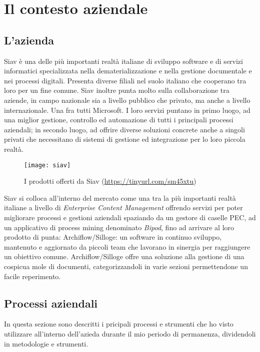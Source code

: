 
\chapter{Il contesto aziendale}

\section{L'azienda}
Siav è una delle più importanti realtà italiane di sviluppo software e di servizi informatici
specializzata nella dematerializzazione e nella gestione documentale e nei processi
digitali. Presenta diverse filiali nel suolo italiano che cooperano tra loro per un fine comune. Siav inoltre punta molto sulla collaborazione tra aziende, in campo nazionale sia a livello pubblico che privato, ma anche a livello internazionale. Una fra tutti Microsoft.
I loro servizi puntano in primo luogo, ad una miglior gestione, controllo ed automazione di tutti i principali processi aziendali; in secondo luogo, ad offrire diverse soluzioni concrete anche a singoli privati che necessitano di sistemi di gestione ed integrazione per lo loro piccola realtà.
\begin{figure}[!h] 
	\centering 
	\texttt{[image: siav]} 
	\caption{I prodotti offerti da Siav (\url{https://tinyurl.com/sm45xtu})}
\end{figure}
Siav si colloca all'interno del mercato come una tra la più importanti realtà italiane a livello di \textit{Enterprise Content Management} offrendo servizi per poter migliorare processi e gestioni aziendali spaziando da un gestore di caselle PEC, ad un applicativo di process mining denominato \textit{Bipod}, fino ad arrivare al loro prodotto di punta: Archiflow/Silloge: un software in continuo sviluppo, mantenuto e aggiornato da piccoli team che lavorano in sinergia per raggiungere un obiettivo comune. Archiflow/Silloge offre una soluzione alla gestione di una cospicua mole di documenti, categorizzandoli in varie sezioni permettendone un facile reperimento.
\section {Processi aziendali}
In questa sezione sono descritti i pricipali processi e strumenti che ho visto utilizzare all'interno dell'azieda durante il mio periodo di permanenza, dividendoli in metodologie e strumenti.
